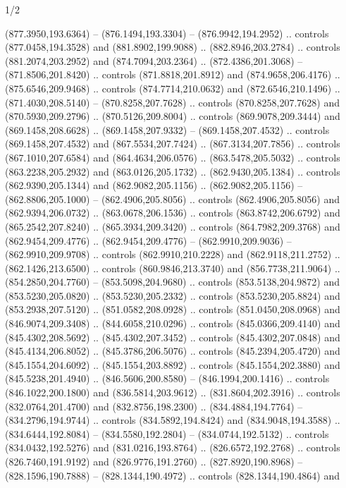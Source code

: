 \begin{flagdescription}{1/2}
\begin{scope}[xshift=0.75\flaglength,yshift=0.5\flagwidth,scale=0.00293\flagwidth]
\begin{scope}[scale=0.675,y=0.80pt, x=0.80pt,yscale=-1,xshift=-720,yshift=-240]
\begin{scope}[miter limit=4.80]
\begin{scope}[miter limit=3.00]
\begin{scope}[fill=black]
  (877.3950,193.6364) -- (876.1494,193.3304) -- (876.9942,194.2952) .. controls
  (877.0458,194.3528) and (881.8902,199.9088) .. (882.8946,203.2784) .. controls
  (881.2074,203.2952) and (874.7094,203.2364) .. (872.4386,201.3068) --
  (871.8506,201.8420) .. controls (871.8818,201.8912) and (874.9658,206.4176) ..
  (875.6546,209.9468) .. controls (874.7714,210.0632) and (872.6546,210.1496) ..
  (871.4030,208.5140) -- (870.8258,207.7628) .. controls (870.8258,207.7628) and
  (870.5930,209.2796) .. (870.5126,209.8004) .. controls (869.9078,209.3444) and
  (869.1458,208.6628) .. (869.1458,207.9332) -- (869.1458,207.4532) .. controls
  (869.1458,207.4532) and (867.5534,207.7424) .. (867.3134,207.7856) .. controls
  (867.1010,207.6584) and (864.4634,206.0576) .. (863.5478,205.5032) .. controls
  (863.2238,205.2932) and (863.0126,205.1732) .. (862.9430,205.1384) .. controls
  (862.9390,205.1344) and (862.9082,205.1156) .. (862.9082,205.1156) --
  (862.8806,205.1000) -- (862.4906,205.8056) .. controls (862.4906,205.8056) and
  (862.9394,206.0732) .. (863.0678,206.1536) .. controls (863.8742,206.6792) and
  (865.2542,207.8240) .. (865.3934,209.3420) .. controls (864.7982,209.3768) and
  (862.9454,209.4776) .. (862.9454,209.4776) -- (862.9910,209.9036) --
  (862.9910,209.9708) .. controls (862.9910,210.2228) and (862.9118,211.2752) ..
  (862.1426,213.6500) .. controls (860.9846,213.3740) and (856.7738,211.9064) ..
  (854.2850,204.7760) -- (853.5098,204.9680) .. controls (853.5138,204.9872) and
  (853.5230,205.0820) .. (853.5230,205.2332) .. controls (853.5230,205.8824) and
  (853.2938,207.5120) .. (851.0582,208.0928) .. controls (851.0450,208.0968) and
  (846.9074,209.3408) .. (844.6058,210.0296) .. controls (845.0366,209.4140) and
  (845.4302,208.5692) .. (845.4302,207.3452) .. controls (845.4302,207.0848) and
  (845.4134,206.8052) .. (845.3786,206.5076) .. controls (845.2394,205.4720) and
  (845.1554,204.6092) .. (845.1554,203.8892) .. controls (845.1554,202.3880) and
  (845.5238,201.4940) .. (846.5606,200.8580) -- (846.1994,200.1416) .. controls
  (846.1022,200.1800) and (836.5814,203.9612) .. (831.8604,202.3916) .. controls
  (832.0764,201.4700) and (832.8756,198.2300) .. (834.4884,194.7764) --
  (834.2796,194.9744) .. controls (834.5892,194.8424) and (834.9048,194.3588) ..
  (834.6444,192.8084) -- (834.5580,192.2804) -- (834.0744,192.5132) .. controls
  (834.0432,192.5276) and (831.0216,193.8764) .. (826.6572,192.2768) .. controls
  (826.7460,191.9192) and (826.9776,191.2760) .. (827.8920,190.8968) --
  (828.1596,190.7888) -- (828.1344,190.4972) .. controls (828.1344,190.4864) and

\end{scope}
\end{scope}
\end{scope}
\end{scope}
\end{scope}
\end{flagdescription}
